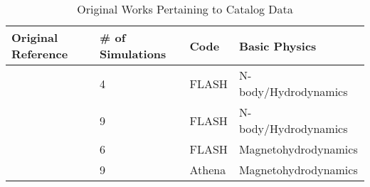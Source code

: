 \begin{table*}
\caption{Original Works Pertaining to Catalog Data\label{tab:sim_table}}
\begin{center}
\begin{tabular}{llll}
\hline
\hline
Original Reference & \# of Simulations & Code & Basic Physics \\
\hline
\citet{zuh10} & 4 & FLASH & N-body/Hydrodynamics \\
\citet{zuh11a} & 9 & FLASH & N-body/Hydrodynamics \\
\citet{zuh11b} & 6 & FLASH & Magnetohydrodynamics \\
\citet{zuh15} & 9 & Athena & Magnetohydrodynamics \\
\hline
\end{tabular}
\end{center}
\end{table*}
